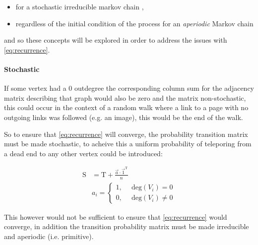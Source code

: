 \documentclass[11pt]{article}
\begin{document}
\begin{itemize}
\item for a stochastic irreducible markov chain \cite[.5]{larsonElementaryLinearAlgebra1991},
\item regardless of the initial condition of the process for an \emph{aperiodic} Markov chain \cite[]{langvilleGooglePageRankScience2012}
\end{itemize}

and so these concepts will be explored in order to address the issues with \eqref{eq:recurrence}.

\paragraph{Stochastic}
\label{stochastic}
If some vertex had a 0 outdegree the corresponding column sum for the adjacency
matrix describing that graph would also be zero and the matrix non-stochastic,
this could occur in the context of a random walk where a link to a page with no
outgoing links was followed (e.g. an image), this would be the end of the
walk.

So to ensure that \eqref{eq:recurrence} will converge, the probability transition
matrix must be made stochastic, to acheive this a uniform probability of teleporing from a dead end to any other vertex could be introduced:

\begin{align}
\mathrm{S} &= \mathrm{T}+ \frac{\vec{a} \cdot \vec{1}^{\mathrm{T}} }{n} \label{eq:nearly-random-surfer} \\
& a_{i} = \begin{cases}
    1      , &\enspace \mathrm{deg}\left( V_{i}\right) = 0  \\
    0      , &\enspace \mathrm{deg}\left( V_{i}\right) \neq 0
\end{cases}
\end{align}

This however would not be sufficient to ensure that \eqref{eq:recurrence} would converge, in addition the transition probability matrix must be made irreducible and aperiodic (i.e. primitive). \cite{langvilleGooglePageRankScience2012}
\end{document}
